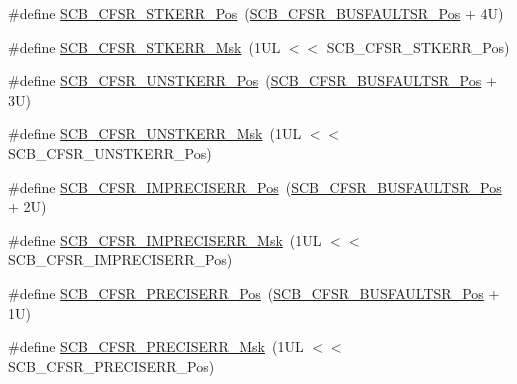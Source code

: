 \begin{DoxyCompactItemize}
\item 
\#define \mbox{\hyperlink{group___c_m_s_i_s___s_c_b_ga62a8fe875fb6cc28e0e36ddf27d81a8f}{S\+C\+B\+\_\+\+C\+F\+S\+R\+\_\+\+S\+T\+K\+E\+R\+R\+\_\+\+Pos}}~(\mbox{\hyperlink{group___c_m_s_i_s___s_c_b_ga555a24f4f57d199f91d1d1ab7c8c3c8a}{S\+C\+B\+\_\+\+C\+F\+S\+R\+\_\+\+B\+U\+S\+F\+A\+U\+L\+T\+S\+R\+\_\+\+Pos}} + 4\+U)
\item 
\#define \mbox{\hyperlink{group___c_m_s_i_s___s_c_b_ga77076fdfa5941327d4d8f0cb99653872}{S\+C\+B\+\_\+\+C\+F\+S\+R\+\_\+\+S\+T\+K\+E\+R\+R\+\_\+\+Msk}}~(1\+U\+L $<$$<$ S\+C\+B\+\_\+\+C\+F\+S\+R\+\_\+\+S\+T\+K\+E\+R\+R\+\_\+\+Pos)
\item 
\#define \mbox{\hyperlink{group___c_m_s_i_s___s_c_b_ga7f70b590d3d8f11145e4ff20f7c9f3e8}{S\+C\+B\+\_\+\+C\+F\+S\+R\+\_\+\+U\+N\+S\+T\+K\+E\+R\+R\+\_\+\+Pos}}~(\mbox{\hyperlink{group___c_m_s_i_s___s_c_b_ga555a24f4f57d199f91d1d1ab7c8c3c8a}{S\+C\+B\+\_\+\+C\+F\+S\+R\+\_\+\+B\+U\+S\+F\+A\+U\+L\+T\+S\+R\+\_\+\+Pos}} + 3\+U)
\item 
\#define \mbox{\hyperlink{group___c_m_s_i_s___s_c_b_ga2dfce5c289681884651f92377d09380e}{S\+C\+B\+\_\+\+C\+F\+S\+R\+\_\+\+U\+N\+S\+T\+K\+E\+R\+R\+\_\+\+Msk}}~(1\+U\+L $<$$<$ S\+C\+B\+\_\+\+C\+F\+S\+R\+\_\+\+U\+N\+S\+T\+K\+E\+R\+R\+\_\+\+Pos)
\item 
\#define \mbox{\hyperlink{group___c_m_s_i_s___s_c_b_gaec426f59eb8d75acd48b32953ac154f5}{S\+C\+B\+\_\+\+C\+F\+S\+R\+\_\+\+I\+M\+P\+R\+E\+C\+I\+S\+E\+R\+R\+\_\+\+Pos}}~(\mbox{\hyperlink{group___c_m_s_i_s___s_c_b_ga555a24f4f57d199f91d1d1ab7c8c3c8a}{S\+C\+B\+\_\+\+C\+F\+S\+R\+\_\+\+B\+U\+S\+F\+A\+U\+L\+T\+S\+R\+\_\+\+Pos}} + 2\+U)
\item 
\#define \mbox{\hyperlink{group___c_m_s_i_s___s_c_b_ga6e6b3b643e1c2e14c96f10b42d59fc64}{S\+C\+B\+\_\+\+C\+F\+S\+R\+\_\+\+I\+M\+P\+R\+E\+C\+I\+S\+E\+R\+R\+\_\+\+Msk}}~(1\+U\+L $<$$<$ S\+C\+B\+\_\+\+C\+F\+S\+R\+\_\+\+I\+M\+P\+R\+E\+C\+I\+S\+E\+R\+R\+\_\+\+Pos)
\item 
\#define \mbox{\hyperlink{group___c_m_s_i_s___s_c_b_gaf4744e87d7f6eddbff803977901d6ad0}{S\+C\+B\+\_\+\+C\+F\+S\+R\+\_\+\+P\+R\+E\+C\+I\+S\+E\+R\+R\+\_\+\+Pos}}~(\mbox{\hyperlink{group___c_m_s_i_s___s_c_b_ga555a24f4f57d199f91d1d1ab7c8c3c8a}{S\+C\+B\+\_\+\+C\+F\+S\+R\+\_\+\+B\+U\+S\+F\+A\+U\+L\+T\+S\+R\+\_\+\+Pos}} + 1\+U)
\item 
\#define \mbox{\hyperlink{group___c_m_s_i_s___s_c_b_gad8fc0d1f80364470e52d3dcf941f38cc}{S\+C\+B\+\_\+\+C\+F\+S\+R\+\_\+\+P\+R\+E\+C\+I\+S\+E\+R\+R\+\_\+\+Msk}}~(1\+U\+L $<$$<$ S\+C\+B\+\_\+\+C\+F\+S\+R\+\_\+\+P\+R\+E\+C\+I\+S\+E\+R\+R\+\_\+\+Pos)

\end{DoxyCompactItemize}
